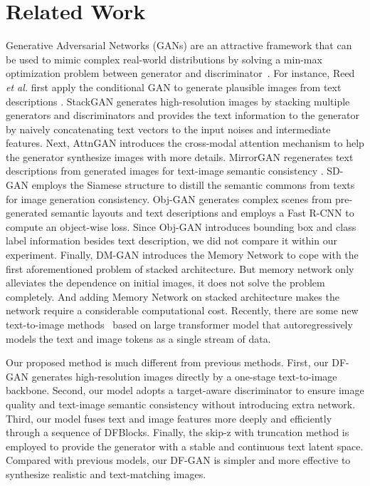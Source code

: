 \documentclass[10pt,twocolumn,letterpaper]{article}
\begin{document}
\section{Related Work}

Generative Adversarial Networks (GANs) \cite{goodfellow2014generative} are an attractive framework that can be used to mimic complex real-world distributions by solving a min-max optimization problem between generator and discriminator~\cite{zhang2019self,karras2019style,karras2020analyzing,tang2020xinggan}.
For instance, Reed \emph{et al.} first apply the conditional GAN to generate plausible images from text descriptions \cite{reed2016generative, reed2016learning}. 
StackGAN \cite{zhang2017stackgan, zhang2018stackgan} generates high-resolution images by stacking multiple generators and discriminators and provides the text information to the generator by naively concatenating text vectors to the input noises and intermediate features. 
Next, AttnGAN \cite{xu2018attngan} introduces the cross-modal attention mechanism to help the generator synthesize images with more details. 
MirrorGAN \cite{qiao2019mirrorgan} regenerates text descriptions from generated images for text-image semantic consistency \cite{zhu2017unpaired}. 
SD-GAN \cite{yin2019semantics} employs the Siamese structure \cite{varior2016gated,varior2016siamese} to distill the semantic commons from texts for image generation consistency. 
Obj-GAN \cite{li2019object} generates complex scenes from pre-generated semantic layouts and text descriptions and employs a Fast R-CNN \cite{girshick2015fast} to compute an object-wise loss.
Since Obj-GAN introduces bounding box and class label information besides text description, we did not compare it within our experiment. 
Finally, DM-GAN \cite{zhu2019dm} introduces the Memory Network \cite{gulcehre2018dynamic,weston2014memory} to cope with the first aforementioned problem of stacked architecture. But memory network only alleviates the dependence on initial images, it does not solve the problem completely. 
And adding Memory Network on stacked architecture makes the network require a considerable computational cost. 
Recently, there are some new text-to-image methods~\cite{ramesh2021zero,lin2021m6} based on large transformer model that autoregressively models the text and image tokens as a single stream of data.

Our proposed method is much different from previous methods.
First, our DF-GAN generates high-resolution images directly by a one-stage text-to-image backbone.
Second, our model adopts a target-aware discriminator to ensure image quality and text-image semantic consistency without introducing extra network.
Third, our model fuses text and image features more deeply and efficiently through a sequence of DFBlocks.
Finally, the skip-z with truncation method is employed to provide the generator with a stable and continuous text latent space.
Compared with previous models, our DF-GAN is simpler and more effective to synthesize realistic and text-matching images.
\end{document}
